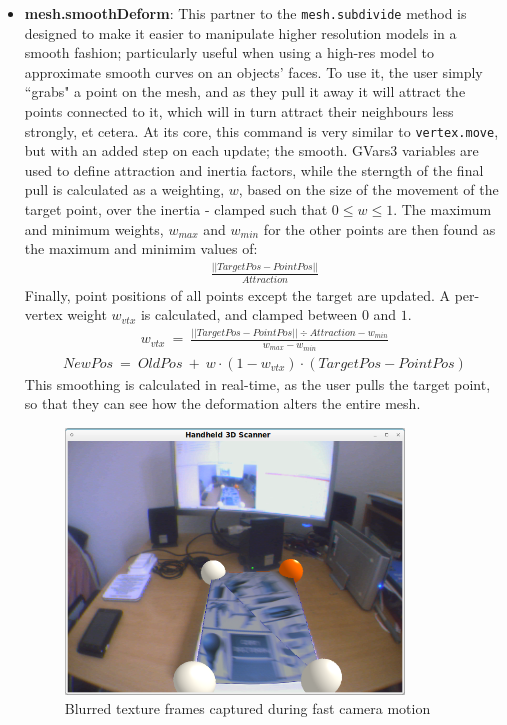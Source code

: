 \documentclass[a4paper,10pt]{report}
\begin{document}
\begin{itemize}
\item{\textbf{mesh.smoothDeform}: This partner to the \texttt{mesh.subdivide} method is designed to make it easier to manipulate higher resolution models in a smooth fashion; particularly useful when using a high-res model to approximate smooth curves on an objects' faces. To use it, the user simply ``grabs" a point on the mesh, and as they pull it away it will attract the points connected to it, which will in turn attract their neighbours less strongly, et cetera. At its core, this command is very similar to \texttt{vertex.move}, but with an added step on each update; the smooth. GVars3 variables are used to define attraction and inertia factors, while the sterngth of the final pull is calculated as a weighting, $w$, based on the size of the movement of the target point, over the inertia - clamped such that $0 \leq w \leq 1$. The maximum and minimum weights, $w_{max}$ and $w_{min}$ for the other points are then found as the maximum and minimim values of:
\begin{eqnarray*}
 \frac{||TargetPos - PointPos||}{Attraction}
\end{eqnarray*}
Finally, point positions of all points except the target are updated. A per-vertex weight $w_{vtx}$ is calculated, and clamped between $0$ and $1$.
\begin{eqnarray*}
w_{vtx} ~=~ \frac{||TargetPos - PointPos|| \div Attraction - w_{min}}{w_{max} - w_{min}}
\end{eqnarray*}
\begin{eqnarray*}
NewPos ~=~ OldPos ~+~ w \cdot (1 - w_{vtx}) \cdot (TargetPos - PointPos)
\end{eqnarray*}
This smoothing is calculated in real-time, as the user pulls the target point, so that they can see how the deformation alters the entire mesh.
}

\begin{figure}
  \begin{center}
    \includegraphics[width=340px]{TextureBlur}
  \end{center}
  \caption{Blurred texture frames captured during fast camera motion}
  \label{camblur}
\end{figure}


\end{itemize}
\end{document}
